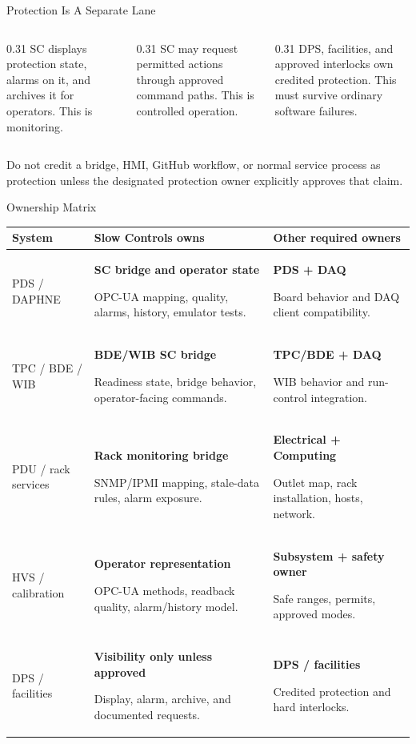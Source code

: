\documentclass[aspectratio=169,10pt]{beamer}
\newcommand{\OwnerCell}[2]{\RaggedRight\textbf{#1}\par{\scriptsize\color{DuneMuted}#2}}
\begin{document}
\begin{frame}{Protection Is A Separate Lane}
\begin{columns}[T,onlytextwidth]
  \begin{column}{0.31\textwidth}
      {SC displays protection state, alarms on it, and archives it for operators.}
      {This is monitoring.}
  \end{column}
  \begin{column}{0.31\textwidth}
      {SC may request permitted actions through approved command paths.}
      {This is controlled operation.}
  \end{column}
  \begin{column}{0.31\textwidth}
      {DPS, facilities, and approved interlocks own credited protection.}
      {This must survive ordinary software failures.}
  \end{column}
\end{columns}
\medskip
{}
  {Do not credit a bridge, HMI, GitHub workflow, or normal service process as protection unless the designated protection owner explicitly approves that claim.}
  {}
\end{frame}

\begin{frame}{Ownership Matrix}
\scriptsize
\renewcommand{\arraystretch}{1.12}
\begin{tabularx}{\textwidth}{@{}p{} p{} X@{}}
\toprule
System & Slow Controls owns & Other required owners \\
\midrule
PDS / DAPHNE &
\OwnerCell{SC bridge and operator state}{OPC-UA mapping, quality, alarms, history, emulator tests.} &
\OwnerCell{PDS + DAQ}{Board behavior and DAQ client compatibility.} \\
\addlinespace
TPC / BDE / WIB &
\OwnerCell{BDE/WIB SC bridge}{Readiness state, bridge behavior, operator-facing commands.} &
\OwnerCell{TPC/BDE + DAQ}{WIB behavior and run-control integration.} \\
\addlinespace
PDU / rack services &
\OwnerCell{Rack monitoring bridge}{SNMP/IPMI mapping, stale-data rules, alarm exposure.} &
\OwnerCell{Electrical + Computing}{Outlet map, rack installation, hosts, network.} \\
\addlinespace
HVS / calibration &
\OwnerCell{Operator representation}{OPC-UA methods, readback quality, alarm/history model.} &
\OwnerCell{Subsystem + safety owner}{Safe ranges, permits, approved modes.} \\
\addlinespace
DPS / facilities &
\OwnerCell{Visibility only unless approved}{Display, alarm, archive, and documented requests.} &
\OwnerCell{DPS / facilities}{Credited protection and hard interlocks.} \\
\bottomrule
\end{tabularx}
\end{frame}
\end{document}
